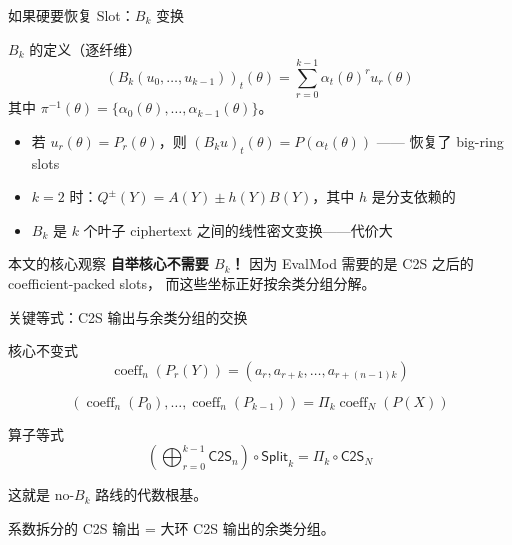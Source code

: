 \documentclass[aspectratio=169, 10pt, xcolor=svgnames, table, UTF8]{ctexbeamer}
\newcommand{\coeffvec}{\operatorname{coeff}}
\newcommand{\cots}{\mathsf{C2S}}
\newcommand{\splitop}{\mathsf{Split}}
\begin{document}
\begin{frame}{如果硬要恢复 Slot：\(B_k\) 变换}
  \begin{block}{\(B_k\) 的定义（逐纤维）}
    \[
    \boxed{(B_k(u_0,\ldots,u_{k-1}))_t(\theta) = \sum_{r=0}^{k-1} \alpha_t(\theta)^r u_r(\theta)}
    \]
    其中 \(\pi^{-1}(\theta) = \{\alpha_0(\theta), \ldots, \alpha_{k-1}(\theta)\}\)。
  \end{block}
  
  \pause
  
  \begin{itemize}
    \item 若 \(u_r(\theta) = P_r(\theta)\)，则 \((B_k u)_t(\theta) = P(\alpha_t(\theta))\) —— 恢复了 big-ring slots
    \item \(k=2\) 时：\(Q^\pm(Y) = A(Y) \pm h(Y) B(Y)\)，其中 \(h\) 是分支依赖的
    \item \(B_k\) 是 \(k\) 个叶子 ciphertext 之间的线性密文变换——\alert{代价大}
  \end{itemize}
  
  \pause
  
  \begin{exampleblock}{本文的核心观察}
    \textbf{自举核心不需要 \(B_k\)！} 因为 EvalMod 需要的是 C2S 之后的 coefficient-packed slots，
    而这些坐标正好按余类分组分解。
  \end{exampleblock}
\end{frame}

\begin{frame}{关键等式：C2S 输出与余类分组的交换}
  \begin{block}{核心不变式}
    \[
    \operatorname{coeff}_n(P_r(Y)) = (a_r, a_{r+k}, \ldots, a_{r+(n-1)k})
    \]
    
    \[
    \boxed{(\coeffvec_n(P_0), \ldots, \coeffvec_n(P_{k-1})) = \Pi_k \coeffvec_N(P(X))}
    \]
  \end{block}
  
  \pause
  
  \begin{block}{算子等式}
    \[
    \boxed{\left(\bigoplus_{r=0}^{k-1} \cots_n\right) \circ \splitop_k = \Pi_k \circ \cots_N}
    \]
  \end{block}
  
  \begin{center}
    \alert{这就是 no-\(B_k\) 路线的代数根基。}
    
    系数拆分的 C2S 输出 = 大环 C2S 输出的余类分组。
  \end{center}
\end{frame}
\end{document}
